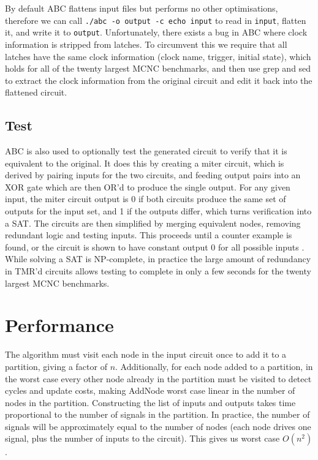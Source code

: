 \documentclass[12pt,final,oneside,a4paper]{dwThesis} %
\begin{document}
   By default \gls{ABC} flattens input files but performs no other optimisations, therefore we can call
   \texttt{./abc -o output -c echo input} to read in \texttt{input}, flatten it, and write it to \texttt{output}.
   Unfortunately, there exists a bug in \gls{ABC} where clock information is stripped from latches.
   To circumvent this we require that all latches have the same clock information (clock name, trigger, initial state),
   which holds for all of the twenty largest \gls{MCNC} benchmarks,
   and then use grep and sed to extract the clock information from the original circuit and edit it back into the flattened circuit.


   \subsection{Test}
   \label{algTest} \gls{ABC} is also used to optionally test
   the generated circuit to verify that it is equivalent to the original. It
   does this by creating a miter circuit, which is derived by pairing inputs
   for the two circuits, and feeding output pairs into an XOR gate which are
   then OR'd to produce the single output. For any given input, the miter
   circuit output is 0 if both circuits produce the same set of outputs for the
   input set, and 1 if the outputs differ, which turns verification into a
   \gls{SAT}.  The circuits are then simplified by merging equivalent nodes,
   removing redundant logic and testing inputs.
   This proceeds until a counter example is found, or the circuit is shown to
   have constant output 0 for all possible inputs \cite{abcSEC, abcCEC}.  While
   solving a \gls{SAT} is NP-complete, in practice the large amount of
   redundancy in \gls{TMR}'d circuits allows testing to complete in only a few
   seconds for the twenty largest \gls{MCNC} benchmarks.


   \section{Performance}
   The algorithm must visit each node in the input
   circuit once to add it to a partition, giving a factor of $n$.
   Additionally, for each node added to a partition, in the worst case every
   other node already in the partition must be visited to detect cycles and
   update costs, making AddNode worst case linear in the number of nodes in the
   partition.  Constructing the list of inputs and outputs takes time
   proportional to the number of signals in the partition. In practice, the
   number of signals will be approximately equal to the number of nodes (each
   node drives one signal, plus the number of inputs to the circuit).  This
   gives us worst case $O(n^2)$.
   
\end{document}
